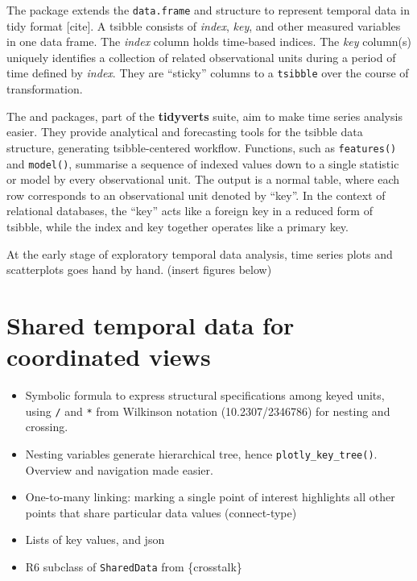 The  package extends the \texttt{data.frame} and
 structure to represent temporal data in tidy format
{[}cite{]}. A tsibble consists of \emph{index}, \emph{key}, and other
measured variables in one data frame. The \emph{index} column holds
time-based indices. The \emph{key} column(s) uniquely identifies a
collection of related observational units during a period of time
defined by \emph{index}. They are ``sticky'' columns to a
\texttt{tsibble} over the course of transformation.

The  and  packages, part of the
\textbf{tidyverts} suite, aim to make time series analysis easier. They
provide analytical and forecasting tools for the tsibble data structure,
generating tsibble-centered workflow. Functions, such as
\texttt{features()} and \texttt{model()}, summarise a sequence of
indexed values down to a single statistic or model by every
observational unit. The output is a normal table, where each row
corresponds to an observational unit denoted by ``key''. In the context
of relational databases, the ``key'' acts like a foreign key in a
reduced form of tsibble, while the index and key together operates like
a primary key.

At the early stage of exploratory temporal data analysis, time series
plots and scatterplots goes hand by hand. (insert figures below)

\hypertarget{shared-temporal-data-for-coordinated-views}{%
\section{Shared temporal data for coordinated
views}\label{shared-temporal-data-for-coordinated-views}}

\begin{itemize}
\tightlist
\item
  Symbolic formula to express structural specifications among keyed
  units, using \texttt{/} and \texttt{*} from Wilkinson notation
  (10.2307/2346786) for nesting and crossing.
\item
  Nesting variables generate hierarchical tree, hence
  \texttt{plotly\_key\_tree()}. Overview and navigation made easier.
\item
  One-to-many linking: marking a single point of interest highlights all
  other points that share particular data values (connect-type)
\item
  Lists of key values, and json
\item
  R6 subclass of \texttt{SharedData} from \{crosstalk\}
\end{itemize}

